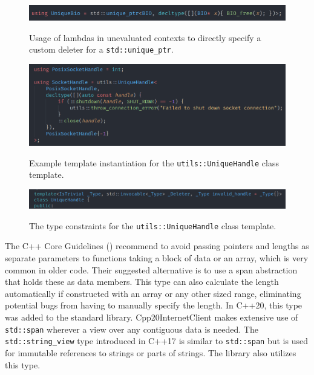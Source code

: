 \documentclass[12pt, a4paper]{article}
\begin{document}
\begin{figure}[ht]
	\centering
	\caption{Usage of lambdas in unevaluated contexts to directly specify a custom deleter for a \texttt{std::unique\_ptr}.}
	\includegraphics[width=\textwidth]{unevaluated_lambdas_unique_ptr}
	\label{fig:unevaluated_lambdas_unique_ptr}
\end{figure}

\begin{figure}[ht]
	\centering
	\caption{Example template instantiation for the \texttt{utils::UniqueHandle} class template.}
	\includegraphics[width=\textwidth]{unique_handle_example}
	\label{fig:unique_handle_example}
\end{figure}

\begin{figure}[ht]
	\centering
	\caption{The type constraints for the \texttt{utils::UniqueHandle} class template.}
	\includegraphics[width=\textwidth]{unique_handle_constraints}
	\label{fig:unique_handle_constraints}
\end{figure}

The C++ Core Guidelines (\cite{CppCoreGuidelines}) recommend to avoid passing pointers and lengths as separate parameters to functions taking a block of data or an array, which is very common in older code. Their suggested alternative is to use a span abstraction that holds these as data members. This type can also calculate the length automatically if constructed with an array or any other sized range, eliminating potential bugs from having to manually specify the length. In C++20, this type was added to the standard library. Cpp20InternetClient makes extensive use of \texttt{std::span} wherever a view over any contiguous data is needed. The \texttt{std::string\_view} type introduced in C++17 is similar to \texttt{std::span} but is used for immutable references to strings or parts of strings. The library also utilizes this type.
\end{document}
